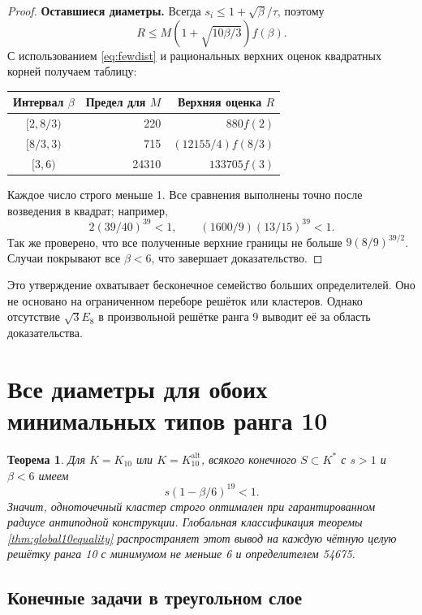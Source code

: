 \documentclass[11pt,a4paper]{article}
\newtheorem{theorem}{Теорема}[section]
\theoremstyle{remark}\newtheorem{remark}[theorem]{Замечание}
\newcommand{\Kalt}{K_{10}^{\mathrm{alt}}}
\begin{document}
\begin{proof}
\textbf{Оставшиеся диаметры.} Всегда $s_i\le1+\sqrt\beta/\tau$, поэтому
\[
R\le M(1+\sqrt{10\beta/3})f(\beta).
\]
С использованием \eqref{eq:fewdist} и рациональных верхних оценок квадратных корней получаем таблицу:
\begin{center}
\begin{tabular}{crr}
\toprule
Интервал $\beta$ & Предел для $M$ & Верхняя оценка $R$\\\midrule
$[2,8/3)$ &220&$880f(2)$\\
$[8/3,3)$ &715&$(12155/4)f(8/3)$\\
$[3,6)$ &24310&$133705f(3)$\\
\bottomrule
\end{tabular}
\end{center}
Каждое число строго меньше 1. Все сравнения выполнены точно после возведения в квадрат; например,
\[
2(39/40)^{39}<1,\qquad (1600/9)(13/15)^{39}<1.
\]
Так же проверено, что все полученные верхние границы не больше $9(8/9)^{39/2}$. Случаи покрывают все $\beta<6$, что завершает доказательство.
\end{proof}

Это утверждение охватывает бесконечное семейство больших определителей. Оно не основано на ограниченном переборе решёток или кластеров. Однако отсутствие $\sqrt3E_8$ в произвольной решётке ранга 9 выводит её за область доказательства.

\section{Все диаметры для обоих минимальных типов ранга 10}

\begin{theorem}\label{thm:cluster10}
Для $K=K_{10}$ или $K=\Kalt$, всякого конечного $S\subset K^*$ с $s>1$ и $\beta<6$ имеем
\[
s(1-\beta/6)^{19}<1.
\]
Значит, одноточечный кластер строго оптимален при гарантированном радиусе антиподной конструкции. Глобальная классификация теоремы \ref{thm:global10equality} распространяет этот вывод на каждую чётную целую решётку ранга 10 с минимумом не меньше 6 и определителем 54675.
\end{theorem}

\subsection{Конечные задачи в треугольном слое}
\end{document}
